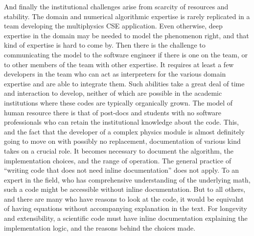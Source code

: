 
And finally the institutional challenges arise from scarcity of
resources and stability. The domain and numerical algorithmic
expertise is rarely replicated in a team developing the multiphysics
CSE application. Even otherwise, deep expertise in the domain may be
needed to model the phenomenon right, and that kind of expertise is
hard to come by. Then there is the challenge to communicating the
model to the software engineer if there is one on the team, or to
other members of the team with other expertise. It requires at least a
few developers in the team who can act as interpreters for the various
domain expertise and are able to integrate them. Such abilities take a
great deal of time and interaction to develop, neither of which are
possible in the academic institutions where these codes are typically
organically grown. The model of human resource there is that of
post-docs and students with no software professionals who can retain
the institutional knowledge about the code. This, and the fact that
the developer of a complex physics module is almost definitely going
to move on with possibly no replacement, documentation of various kind
takes on a crucial role. It becomes necessary to document the
algorithm, the implementation choices, and the range of operation. The
general practice of ``writing code that does not need inline
documentation'' does not apply. To an expert in the field, who has
comprehensive understanding of the underlying math, such a code might
be accessible without inline documentation. But to all others, and
there are many who have reasons to look at the code, it would be
equivalnt of having equations without accompanying explanation
in the text. For longevity and extensibility, a scientific code must
have inline documentation explaining the implementation logic, and the
reasons behind the choices made. 
